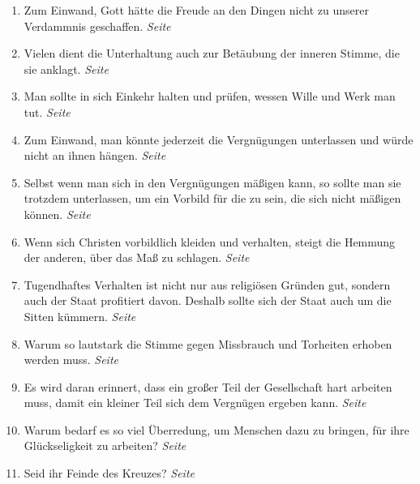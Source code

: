 \begin{enumerate}
 \item Zum Einwand, Gott hätte die Freude an den Dingen nicht zu unserer
Verdammnis geschaffen.
 \dotfill \textit{Seite~\pageref{ref:17_11_einwand_2}}\\

 \item Vielen dient die Unterhaltung auch zur Betäubung der inneren Stimme, die
sie anklagt.
 \dotfill \textit{Seite~\pageref{ref:17_11_beteubung}}\\

 \item Man sollte in sich Einkehr halten und prüfen, wessen Wille und Werk
man tut.
 \dotfill \textit{Seite~\pageref{ref:17_12_einkehr}}\\

 \item Zum Einwand, man könnte jederzeit die Vergnügungen unterlassen und würde
nicht an ihnen hängen.
 \dotfill \textit{Seite~\pageref{ref:18_02_einwand}}\\

 \item Selbst wenn man sich in den Vergnügungen mäßigen kann, so sollte man sie
trotzdem unterlassen, um ein Vorbild für die zu sein, die sich nicht mäßigen
können.
 \dotfill \textit{Seite~\pageref{ref:18_03_vorbild}}\\

 \item Wenn sich Christen vorbildlich kleiden und verhalten, steigt die Hemmung
der anderen, über das Maß zu schlagen.
 \dotfill \textit{Seite~\pageref{ref:18_08_vorbild_kleidung}}\\

 \item Tugendhaftes Verhalten ist nicht nur aus religiösen Gründen gut, sondern
auch der Staat profitiert davon. Deshalb sollte sich der Staat auch um die
Sitten kümmern.
 \dotfill \textit{Seite~\pageref{ref:18_09_gesellschaftlich}}\\

 \item Warum so lautstark die Stimme gegen Missbrauch und Torheiten erhoben
werden muss.
 \dotfill \textit{Seite~\pageref{ref:18_09_lautstark}}\\

 \item Es wird daran erinnert, dass ein großer Teil der Gesellschaft hart
arbeiten muss, damit ein kleiner Teil sich dem Vergnügen ergeben kann.
 \dotfill \textit{Seite~\pageref{ref:18_10_ungeraechtikeit}}\\

 \item Warum bedarf es so viel Überredung, um Menschen dazu zu bringen, für ihre
Glückseligkeit zu arbeiten?
 \dotfill \textit{Seite~\pageref{ref:18_11_ueberredung}}\\

 \item Seid ihr Feinde des Kreuzes?
 \dotfill \textit{Seite~\pageref{ref:18_11_feinde_des_kreuzes}}\\
\end{enumerate}
